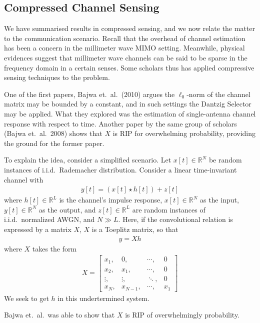 \documentclass[12pt]{article}
\begin{document}
\subsection{Compressed Channel Sensing}

We have summarised results in compressed sensing, and we now relate the matter to the communication scenario.
Recall that the overhead of channel estimation has been a concern in the millimeter wave MIMO setting.
Meanwhile, physical evidences suggest that millimeter wave channels can be said to be sparse in the frequency domain in a certain senses.
Some scholars thus has applied compressive sensing techniques to the problem.

One of the first papers, Bajwa et.\ al.\ (2010) argues the \(\ell_0\)-norm of the channel matrix may be bounded by a constant, and in such settings the Dantzig Selector may be applied.
What they explored was the estimation of single-antenna channel response with respect to time.
Another paper by the same group of scholars (Bajwa et.\ al.\ 2008) shows that \(X\) is RIP for overwhelming probability, providing the ground for the former paper.

To explain the idea, consider a simplified scenario.
Let \(x[t] \in \mathbb{R}^N\) be random instances of i.i.d.\ Rademacher distribution.
Consider a linear time-invariant channel with
\begin{gather}
y[t] =(x[t] \star h[t]) +z[t]
\end{gather}
where \(h[t] \in \mathbb{R}^L\) is the channel's impulse response, \(x[t] \in \mathbb{R}^N\) as the input, \(y[t] \in \mathbb{R}^N\) as the output, and \(z[t] \in \mathbb{R}^L\) are random instances of i.i.d.\ normalized AWGN, and \(N \gg L\).
Here, if the convolutional relation is expressed by a matrix \(X\), \(X\) is a Toeplitz matrix, so that
\begin{gather}
y =X h
\end{gather}
where \(X\) takes the form
\begin{align}
X
=\begin{bmatrix}
x_1, &0, &\cdots, &0 \\
x_2, &x_1, &\cdots, &0 \\
\vdots, &\vdots, &\ddots, &0 \\
x_N, &x_{N-1}, &\cdots, &x_1
\end{bmatrix}
\end{align}
We seek to get \(h\) in this undertermined system.

Bajwa et.\ al.\ was able to show that \(X\) is RIP of overwhelmingly probability.
\end{document}
